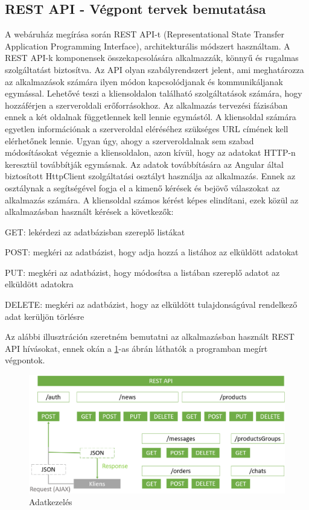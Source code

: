 \subsection{REST API - Végpont tervek bemutatása}
\label{subsection:restapi}

A webáruház megírása során REST API-t (Representational State Transfer Application Programming Interface)\cite{restapi}, architekturális módszert használtam. A REST API-k komponensek összekapcsolására alkalmazzák, könnyű és rugalmas szolgáltatást biztosítva. Az API olyan szabályrendszert jelent, ami meghatározza az alkalmazások számára ilyen módon kapcsolódjanak és kommunikáljanak egymással. Lehetővé teszi a kliensoldalon található szolgáltatások számára, hogy hozzáférjen a szerveroldali erőforrásokhoz. Az alkalmazás tervezési fázisában ennek a két oldalnak függetlennek kell lennie egymástól. A kliensoldal számára egyetlen információnak a szerveroldal eléréséhez szükséges URL címének kell elérhetőnek lennie. Ugyan úgy, ahogy a szerveroldalnak sem szabad módosításokat végeznie a kliensoldalon, azon kívül, hogy az adatokat HTTP-n keresztül továbbítják egymásnak. Az adatok továbbítására az Angular által biztosított HttpClient\cite{http} szolgáltatási osztályt használja az alkalmazás. Ennek az osztálynak a segítségével fogja el a kimenő kérések és bejövő válaszokat az alkalmazás számára. A kliensoldal számos kérést képes elindítani, ezek közül az alkalmazásban használt kérések a következők:

\begin{compactitem}
	\item GET: lekérdezi az adatbázisban szereplő listákat
	\item POST: megkéri az adatbázist, hogy adja hozzá a listához az elküldött adatokat
	\item PUT: megkéri az adatbázist, hogy módosítsa a listában szereplő adatot az elküldött adatokra
	\item DELETE: megkéri az adatbázist, hogy az elküldött tulajdonságúval rendelkező adat kerüljön törlésre
\end{compactitem}

\bigskip
Az alábbi illusztráción szeretném bemutatni az alkalmazásban használt REST API hívásokat, ennek okán a \ref{fig.picture-8}-as ábrán láthatók a programban megírt végpontok.

\begin{figure}[H]
	\centering
	\includegraphics[width=1.0\textwidth]{images/restapi_bemutatasa.png}
	\caption{Adatkezelés}
	\label{fig.picture-8}
\end{figure}

